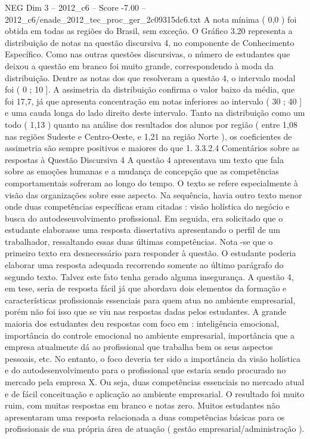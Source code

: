 \begin{textsample}{NEG Dim 3 – 2012\_c6 – Score -7.00 – 2012\_c6/enade\_2012\_tec\_proc\_ger\_2c09315dc6.txt}
A nota mínima ( 0,0 ) foi obtida em todas as regiões do Brasil, sem exceção.
O Gráfico 3.20 representa a distribuição de notas na questão discursiva 4, no componente de Conhecimento Específico.
Como nas outras questões discursivas, o número de estudantes que deixou a questão em branco foi muito grande, correspondendo à moda da distribuição.
Dentre as notas dos que resolveram a questão 4, o intervalo modal foi ( 0 ; 10 ].
A assimetria da distribuição confirma o valor baixo da média, que foi 17,7, já que apresenta concentração em notas inferiores ao intervalo ( 30 ; 40 ] e uma cauda longa do lado direito deste intervalo.
Tanto na distribuição como um todo ( 1,13 ) quanto na análise dos resultados dos alunos por região ( entre 1,08 nas regiões Sudeste e Centro-Oeste, e 1,21 na região Norte ), os coeficientes de assimetria são sempre positivos e maiores do que 1. 3.3.2.4 Comentários sobre as respostas à Questão Discursiva 4 A questão 4 apresentava um texto que fala sobre as emoções humanas e a mudança de concepção que as competências comportamentais sofreram ao longo do tempo.
O texto se refere especialmente à visão das organizações sobre esse aspecto.
Na sequência, havia outro texto menor onde duas competências específicas eram citadas : visão holística do negócio e busca do autodesenvolvimento profissional.
Em seguida, era solicitado que o estudante elaborasse uma resposta dissertativa apresentando o perfil de um trabalhador, ressaltando essas duas últimas competências.
Nota -se que o primeiro texto era desnecessário para responder à questão.
O estudante poderia elaborar uma resposta adequada recorrendo somente ao último parágrafo do segundo texto.
Talvez este fato tenha gerado alguma insegurança.
A questão 4, em tese, seria de resposta fácil já que abordava dois elementos da formação e características profissionais essenciais para quem atua no ambiente empresarial, porém não foi isso que se viu nas respostas dadas pelos estudantes.
A grande maioria dos estudantes deu respostas com foco em : inteligência emocional, importância do controle emocional no ambiente empresarial, importância que a empresa atualmente dá ao profissional que trabalha bem os seus aspectos pessoais, etc.
No entanto, o foco deveria ter sido a importância da visão holística e do autodesenvolvimento para o profissional que estaria sendo procurado no mercado pela empresa X.
Ou seja, duas competências essenciais no mercado atual e de fácil conceituação e aplicação ao ambiente empresarial.
O resultado foi muito ruim, com muitas respostas em branco e notas zero.
Muitos estudantes não apresentaram uma resposta relacionada a duas competências básicas para os profissionais de sua própria área de atuação ( gestão empresarial/administração ).

\end{textsample}
